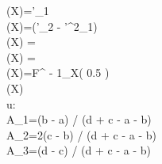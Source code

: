 {(X)=\mu'_{1}\\
(X)=(\mu'_{2} - \mu'^{2}_{1})\\
(X) = \\
(X) = \\
(X)=F^{ - 1}_{X}\left( 0.5 \right)\\
(X)\in [b,c]\\
u:\\
A_{1}=(b - a) / (d + c - a - b)\\
A_{2}=2(c - b) / (d + c - a - b)\\
A_{3}=(d - c) / (d + c - a - b)\\

}
